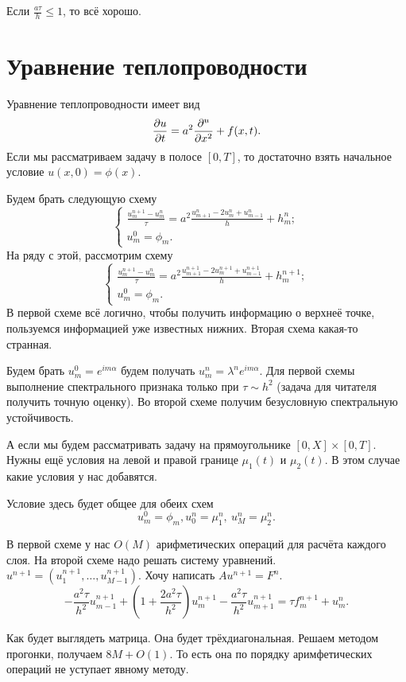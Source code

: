 Если $\frac{a\tau}h \le 1$, то всё хорошо.

\section{Уравнение теплопроводности}
Уравнение теплопроводности имеет вид
\[
  \frac{\partial u}{\partial t} = a^2 \frac{\partial ^u}{\partial x^2} + f(x,t).
\]
Если мы рассматриваем задачу в полосе $[0,T]$, то достаточно взять начальное условие $u(x,0) = \phi(x)$.

Будем брать следующую схему
\[
 \begin{cases}
  \frac{ u_m^{n+1} - u_m^n}{\tau} = a^2 \frac{ u_{m+1}^n - 2u_m^n + u_{m-1}^n}{h} + h_m^n;\\
  u_m^0 = \phi_m.
\end{cases}
\]
На ряду с этой, рассмотрим схему
\[
 \begin{cases}
  \frac{ u_m^{n+1} - u_m^n}{\tau} = a^2 \frac{ u_{m+1}^{n+1} - 2u_m^{n+1} + u_{m-1}^{n+1}}{h} + h_m^{n+1};\\
  u_m^0 = \phi_m.
\end{cases}
\]
В первой схеме всё логично, чтобы получить информацию о верхнеё точке, пользуемся информацией уже известных нижних.
Вторая схема какая-то странная.

Будем брать $u_m^0 = e^{im\alpha}$ будем получать $u_m^n = \lambda^n e^{im\alpha}$. Для первой схемы выполнение спектрального признака только при $\tau\sim h^2$ (задача для читателя получить точную оценку). Во второй схеме получим безусловную спектральную устойчивость.


А если мы будем рассматривать задачу на прямоугольнике $[0,X]\times [0,T]$. Нужны ещё условия на левой и правой границе $\mu_1(t)$ и $\mu_2(t)$. В этом случае какие условия у нас добавятся.

Условие здесь будет общее для обеих схем
\[
  u_m^0 = \phi_m, u_0^n = \mu_1^n,\ u_M^n = \mu_2^n.
\]

В первой схеме у нас $O(M)$ арифметических операций для расчёта каждого слоя. На второй схеме надо решать систему уравнений. $u^{n+1}= (u_1^{n+1},\dots,u_{M-1}^{n+1})$. Хочу написать $Au^{n+1} = F^n$. 
\[
 - \frac{a^2\tau}{h^2} u_{m-1}^{n+1} + \left(1 + \frac{2 a^2\tau}{h^2}\right) u_m^{n+1} - \frac{a^2\tau}{h^2} u_{m+1}^{n+1} = \tau f_m^{n+1} + u_m^n.
\]

Как будет выглядеть матрица. Она будет трёхдиагональная. Решаем методом прогонки, получаем $8M + O(1)$. То есть она по порядку аримфетических операций не уступает явному методу.
